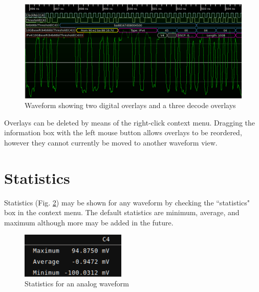 \begin{figure}[H]
\centering
\includegraphics[width=14cm]{images/overlays.png}
\caption{Waveform showing two digital overlays and a three decode overlays}
\label{overlays}
\end{figure}

Overlays can be deleted by means of the right-click context menu. Dragging the information box with the left mouse
button allows overlays to be reordered, however they cannot currently be moved to another waveform view.

\section{Statistics}

Statistics (Fig. \ref{stats}) may be shown for any waveform by checking the ``statistics" box in the context menu. The
default statistics are minimum, average, and maximum although more may be added in the future.


\begin{figure}[H]
\centering
\includegraphics[width=5cm]{images/stats.png}
\caption{Statistics for an analog waveform}
\label{stats}
\end{figure}
